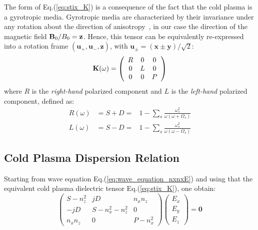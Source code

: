 The form of Eq.(\ref{eq:stix_K}) is a consequence of the fact that the cold plasma is a gyrotropic media. Gyrotropic media are characterized by their invariance under any rotation about the direction of anisotropy~\cite{Mackay2010}, in our case the direction of the magnetic field ${\mathbf B}_0/B_0=\mathbf{z}$. Hence, this tensor can be equivalently re-expressed into a rotation frame $(\mathbf{u}_{+}, \mathbf{u}_{-},  \mathbf{z})$, with $\mathbf{u}_{\pm}=(\mathbf{x}\pm \mathbf{y})/\sqrt{2}$:  
\begin{equation}
{\mathbf K}(\omega)
=
\left(\begin{array}{ccc}
R & 0 & 0\\
0 & L & 0\\
0 & 0 & P
\end{array}\right)
\label{eq:stix_K_RLP}
\end{equation}
where $R$ is the \textit{right-hand} polarized component and $L$ is the \textit{left-hand} polarized component, defined as:
\begin{subequations}
	\begin{eqnarray}
	R(\omega) 
	& = S + D = & 
	1-\sum_{s}\frac{\omega_{s}^{2}}{\omega(\omega+\Omega_{s})}
	\label{eq:stix_R}
	\\
	L(\omega)
	& = S - D = & 
	1-\sum_{s}\frac{\omega_{s}^{2}}{\omega(\omega-\Omega_{s})}
	\label{eq:stix_L}
	\end{eqnarray}
	\label{eq:stix_RL}
\end{subequations}


\subsection{Cold Plasma Dispersion Relation}
Starting from wave equation Eq.(\ref{eq:wave_equation_nxnxE}) and using that the equivalent cold plasma dielectric tensor Eq.(\ref{eq:stix_K}), one obtain:
\begin{equation}
\left(\begin{array}{ccc}
S - n_{z}^{2} & jD & n_{x}n_{z}\\
-jD & S - n_{x}^{2} - n_{z}^{2} & 0\\
n_{x}n_{z} & 0 & P - n_{x}^{2}
\end{array}\right)\left(\begin{array}{c}
E_{x}\\
E_{y}\\
E_{z}
\end{array}\right)=\mathbf{0}
\label{eq:relation_disp_matr_froid}
\end{equation}

